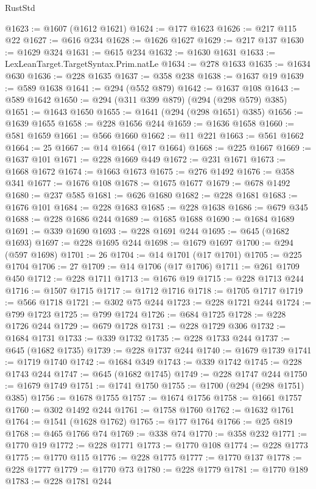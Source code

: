\begin{lexlean}{RustStd}
\begin{coremodule}
@1623 := @1607 (@1612 @1621)
@1624 := @177 @1623
@1626 := @217 @115 @22
@1627 := @616 @234
@1628 := @1626 @1627
@1629 := @217 @137
@1630 := @1629 @324
@1631 := @615 @234
@1632 := @1630 @1631
@1633 := LexLeanTarget.TargetSyntax.Prim.natLe
@1634 := @278 @1633
@1635 := @1634 @630
@1636 := @228 @1635
@1637 := @358 @238
@1638 := @1637 @19
@1639 := @589 @1638
@1641 := @294 (@552 @879)
@1642 := @1637 @108
@1643 := @589 @1642
@1650 := @294 (@311 @399 @879) (@294 (@298 @579) @385)
@1651 := @1643 @1650
@1655 := @1641 (@294 (@298 @1651) @385)
@1656 := @1639 @1655
@1658 := @228 @1656 @244
@1659 := @1636 @1658
@1660 := @581 @1659
@1661 := @566 @1660
@1662 := @11 @221
@1663 := @561 @1662
@1664 := 25
@1667 := @14 @1664 (@17 @1664)
@1668 := @225 @1667
@1669 := @1637 @101
@1671 := @228 @1669 @449
@1672 := @231 @1671
@1673 := @1668 @1672
@1674 := @1663 @1673
@1675 := @276 @1492
@1676 := @358 @341
@1677 := @1676 @108
@1678 := @1675 @1677
@1679 := @678 @1492
@1680 := @237 @585
@1681 := @626 @1680
@1682 := @228 @1681
@1683 := @1676 @101
@1684 := @228 @1683
@1685 := @228 @1638
@1686 := @679 @345
@1688 := @228 @1686 @244
@1689 := @1685 @1688
@1690 := @1684 @1689
@1691 := @339 @1690
@1693 := @228 @1691 @244
@1695 := @645 (@1682 @1693)
@1697 := @228 @1695 @244
@1698 := @1679 @1697
@1700 := @294 (@597 @1698)
@1701 := 26
@1704 := @14 @1701 (@17 @1701)
@1705 := @225 @1704
@1706 := 27
@1709 := @14 @1706 (@17 @1706)
@1711 := @261 @1709 @450
@1712 := @228 @1711
@1713 := @1676 @19
@1715 := @228 @1713 @244
@1716 := @1507 @1715
@1717 := @1712 @1716
@1718 := @1705 @1717
@1719 := @566 @1718
@1721 := @302 @75 @244
@1723 := @228 @1721 @244
@1724 := @799 @1723
@1725 := @799 @1724
@1726 := @684 @1725
@1728 := @228 @1726 @244
@1729 := @679 @1728
@1731 := @228 @1729 @306
@1732 := @1684 @1731
@1733 := @339 @1732
@1735 := @228 @1733 @244
@1737 := @645 (@1682 @1735)
@1739 := @228 @1737 @244
@1740 := @1679 @1739
@1741 := @1719 @1740
@1742 := @1684 @349
@1743 := @339 @1742
@1745 := @228 @1743 @244
@1747 := @645 (@1682 @1745)
@1749 := @228 @1747 @244
@1750 := @1679 @1749
@1751 := @1741 @1750
@1755 := @1700 (@294 (@298 @1751) @385)
@1756 := @1678 @1755
@1757 := @1674 @1756
@1758 := @1661 @1757
@1760 := @302 @1492 @244
@1761 := @1758 @1760
@1762 := @1632 @1761
@1764 := @1541 (@1628 @1762)
@1765 := @177 @1764
@1766 := @25 @819
@1768 := @465 @1766 @74
@1769 := @338 @74
@1770 := @358 @232
@1771 := @1770 @19
@1772 := @228 @1771
@1773 := @1770 @108
@1774 := @228 @1773
@1775 := @1770 @115
@1776 := @228 @1775
@1777 := @1770 @137
@1778 := @228 @1777
@1779 := @1770 @73
@1780 := @228 @1779
@1781 := @1770 @189
@1783 := @228 @1781 @244

\end{coremodule}
\end{lexlean}
